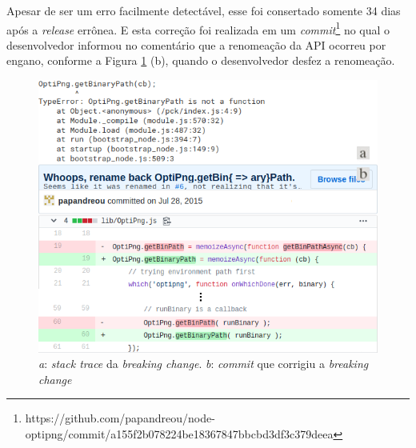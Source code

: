 Apesar de ser um erro facilmente detectável, esse foi consertado somente 34 dias após a \textit{release} errônea. E esta correção foi realizada em um \textit{commit}\footnote{https://github.com/papandreou/node-optipng/commit/a155f2b078224be18367847bbcbd3df3c379deea} no qual o desenvolvedor informou no comentário que a renomeação da \gls{API} ocorreu por engano, conforme a Figura \ref{fig:bc_optipng} (b), quando o desenvolvedor desfez a renomeação.

\begin{figure}
    \centering
    \includegraphics[scale=0.65]{figuras/bc_optipng.png}
    \caption{\textit{a}: \textit{stack trace} da \textit{breaking change}. \textit{b}: \textit{commit} que corrigiu a \textit{breaking change}}
    \label{fig:bc_optipng}
\end{figure}{}